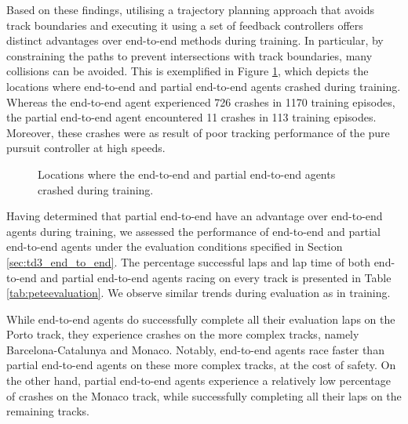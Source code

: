 Based on these findings, utilising a trajectory planning approach that avoids track boundaries and executing it using a set of feedback controllers offers distinct advantages over end-to-end methods during training.
In particular, by constraining the paths to prevent intersections with track boundaries, many collisions can be avoided. This is exemplified in Figure \ref{fig:esp_crashes}, which depicts the locations where end-to-end and partial end-to-end agents crashed during training.
Whereas the end-to-end agent experienced 726 crashes in 1170 training episodes, the partial end-to-end agent encountered 11 crashes in 113 training episodes.
Moreover, these crashes were as result of poor tracking performance of the pure pursuit controller at high speeds.
\begin{figure}[htb!]
    \centering
    
    \caption{Locations where the end-to-end and partial end-to-end agents crashed during training.}
    \label{fig:esp_crashes}
\end{figure}

Having determined that partial end-to-end have an advantage over end-to-end agents during training, we assessed the performance of end-to-end and partial end-to-end agents under the evaluation conditions specified in Section \ref{sec:td3_end_to_end}.
The percentage successful laps and lap time of both end-to-end and partial end-to-end agents racing on every track is presented in Table \ref{tab:peteevaluation}.
We observe similar trends during evaluation as in training.



While end-to-end agents do successfully complete all their evaluation laps on the Porto track, they experience crashes on the more complex tracks, namely Barcelona-Catalunya and Monaco.
Notably, end-to-end agents race faster than partial end-to-end agents on these more complex tracks, at the cost of safety.
On the other hand, partial end-to-end agents experience a relatively low percentage of crashes on the Monaco track, while successfully completing all their laps on the remaining tracks.


